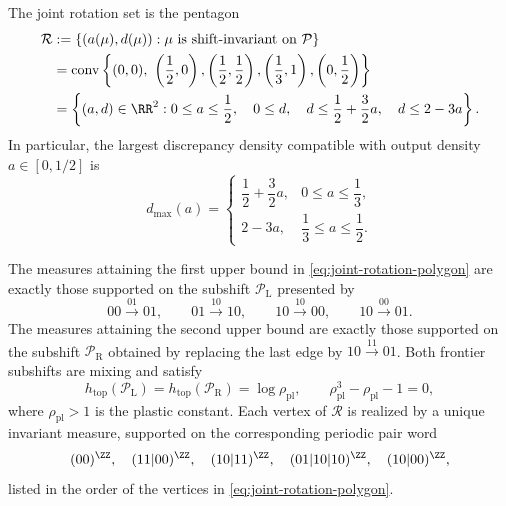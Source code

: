 \begin{theorem}
\label{thm:joint-rotation}
The joint rotation set is the pentagon
\begin{align}
\mathcal R
&:=\left\{(a(\mu),d(\mu)):
\text{\(\mu\) is shift-invariant on \(\mathcal P\)}\right\}\notag\\
&=\operatorname{conv}\left\{
(0,0),\ \left(\frac12,0\right),
\left(\frac12,\frac12\right),
\left(\frac13,1\right),
\left(0,\frac12\right)
\right\}\label{eq:joint-rotation-polygon}\\
&=\left\{(a,d)\in\RR^2:
0\le a\le\frac12,\quad 0\le d,\quad
d\le\frac12+\frac32a,\quad d\le2-3a
\right\}.\notag
\end{align}
In particular, the largest discrepancy density compatible with output density
\(a\in[0,1/2]\) is
\begin{equation}
d_{\max}(a)=
\begin{cases}
\dfrac12+\dfrac32a,&0\le a\le\dfrac13,\\[2mm]
2-3a,&\dfrac13\le a\le\dfrac12.
\end{cases}
\label{eq:max-discrepancy-profile}
\end{equation}

The measures attaining the first upper bound in
\eqref{eq:joint-rotation-polygon} are exactly those supported on the subshift
\(\mathcal P_{\mathrm L}\) presented by
\[
00\xrightarrow{01}01,\qquad
01\xrightarrow{10}10,\qquad
10\xrightarrow{10}00,\qquad
10\xrightarrow{00}01.
\]
The measures attaining the second upper bound are exactly those supported on
the subshift \(\mathcal P_{\mathrm R}\) obtained by replacing the last edge by
\(10\xrightarrow{11}01\). Both frontier subshifts are mixing and satisfy
\[
h_{\mathrm{top}}(\mathcal P_{\mathrm L})
=h_{\mathrm{top}}(\mathcal P_{\mathrm R})
=\log\rho_{\mathrm{pl}},
\qquad
\rho_{\mathrm{pl}}^3-\rho_{\mathrm{pl}}-1=0,
\]
where \(\rho_{\mathrm{pl}}>1\) is the plastic constant. Each vertex of
\(\mathcal R\) is realized by a unique invariant measure, supported on the
corresponding periodic pair word
\[
(00)^\ZZ,\quad (11|00)^\ZZ,\quad (10|11)^\ZZ,
\quad (01|10|10)^\ZZ,\quad (10|00)^\ZZ,
\]
listed in the order of the vertices in \eqref{eq:joint-rotation-polygon}.
\end{theorem}

